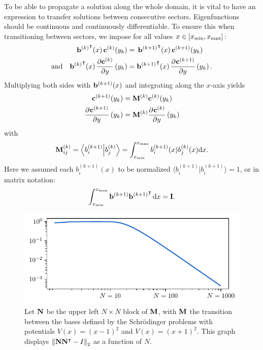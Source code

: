To be able to propagate a solution along the whole domain, it is vital to have an expression to transfer solutions between consecutive sectors. Eigenfunctions should be continuous and continuously differentiable. To ensure this when transitioning between sectors, we impose for all values $x \in [{x_{\text{min}}}, {x_{\text{max}}}]$:
\begin{align*}
  {\vb{b}^{(k)}}^\intercal(x) \, \vb{c}^{(k)}(y_k)                   & =\, {\vb{b}^{(k+1)}}^\intercal(x) \, \vb{c}^{(k+1)}(y_k)                            \\
  \text{and}\quad
  {\vb{b}^{(k)}}^\intercal(x)\,\pdv{\vb{c}^{(k)}}{y}\left(y_k\right) & = {\vb{b}^{(k+1)}}^\intercal(x)\,\pdv[]{\vb{c}^{(k+1)}}{y}\left(y_k\right) \text{.}
\end{align*}
Multiplying both sides with $\vb{b}^{(k+1)}(x)$ and integrating along the $x$-axis yields
\begin{align*}
  \vb{c}^{(k+1)}(y_k)                       & = \vb{M}^{(k)} \vb{c}^{(k)}(y_k)                       \\
  \pdv[]{\vb{c}^{(k+1)}}{y}\left(y_k\right) & = \vb{M}^{(k)} \pdv[]{\vb{c}^{(k)}}{y}\left(y_k\right)
\end{align*}
with
$$
  \vb{M}^{(k)}_{ij} = \bra{b_{i}^{(k+1)}}\ket{b_{j}^{(k)}} = \int_{x_{\text{min}}}^{x_{\text{max}}} b_i^{(k+1)}(x) b_j^{(k)}(x) \dd x \text{.}
$$
Here we assumed each $b_i^{(k+1)}(x)$ to be normalized $\langle b_{i}^{(k+1)} | b_{i}^{(k+1)} \rangle = 1$, or in matrix notation:
\begin{equation}\label{equ:c3_b_orthonormal}
  \int_{x_{\text{min}}}^{x_{\text{max}}} \vb{b}^{(k+1)} {\vb{b}^{(k+1)}}^\intercal\,\dd x = \vb{I}\text{.}
\end{equation}

\begin{figure}
  \begin{center}
    \includegraphics[width=\textwidth]{img/chapter3/orthogonal_m.pdf}
  \end{center}
  \caption{Let $\vb{N}$ be the upper left $N \times N$ block of $\vb{M}$, with $\vb{M}$ the transition between the bases defined by the Schrödinger problems with potentials $V(x) = (x-1)^2$ and $V(x) = (x+1)^2$. This graph displays $\left\| \vb{N} {\vb{N}}^\intercal - I \right\|_2$ as a function of $N$.}\label{fig:c3_orthogonal_m}
\end{figure}

